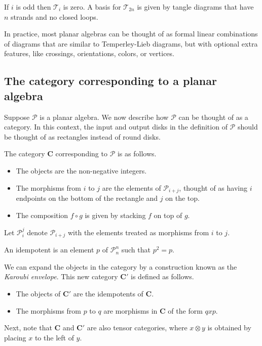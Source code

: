 If $i$ is odd then $\mathcal{T}_i$ is zero.
A basis for $\mathcal{T}_{2n}$
is given by tangle diagrams
that have $n$ strands and no closed loops.

In practice,
most planar algebras
can be thought of as formal linear combinations of diagrams
that are similar to Temperley-Lieb diagrams,
but with optional extra features,
like crossings, orientations, colors, or vertices.

\subsection{The category corresponding to a planar algebra}

Suppose $\mathcal{P}$ is a planar algebra.
We now describe how $\mathcal{P}$ can be thought of as a category.
In this context,
the input and output disks in the definition of $\mathcal{P}$
should be thought of as rectangles instead of round disks.

The category $\mathbf{C}$ corresponding to $\mathcal{P}$ is as follows.
\begin{itemize}
\item The objects are the non-negative integers.
\item The morphisms from $i$ to $j$
      are the elements of $\mathcal{P}_{i+j}$,
      thought of as having $i$ endpoints on the bottom of the rectangle
      and $j$ on the top.
\item The composition $f \circ g$
      is given by stacking $f$ on top of $g$.
\end{itemize}

Let $\mathcal{P}^j_i$ denote $\mathcal{P}_{i+j}$
with the elements treated as morphisms from $i$ to $j$.

An idempotent
is an element $p$ of $\mathcal{P}^n_n$
such that $p^2 = p$.


We can expand the objects in the category
by a construction known as the {\em Karoubi envelope}.
This new category $\mathbf{C}'$ is defined as follows.
\begin{itemize}
\item The objects of $\mathbf{C}'$ are
      the idempotents of $\mathbf{C}$.
\item The morphisms from $p$ to $q$
      are morphisms in $\mathbf{C}$ of the form $qxp$.
\end{itemize}

Next, note that
$\mathbf{C}$ and $\mathbf{C}'$
are also tensor categories,
where $x \otimes y$
is obtained by placing $x$ to the left of $y$.

